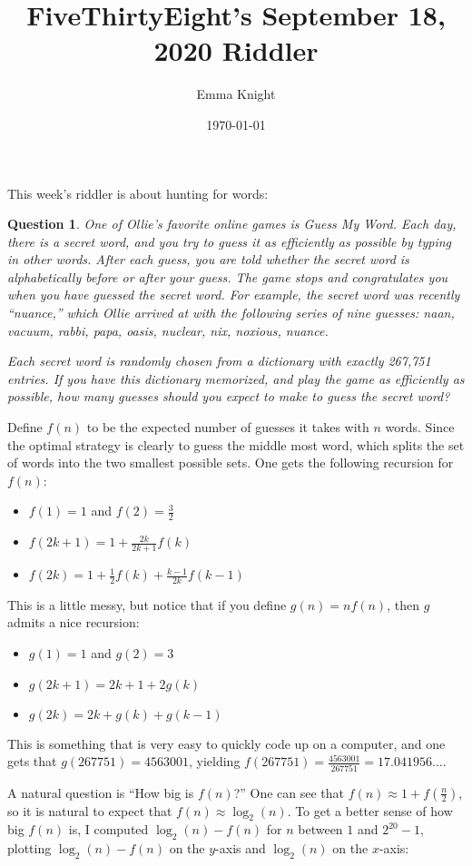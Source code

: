 \documentclass[11pt]{article}
\title{FiveThirtyEight's September 18, 2020 Riddler}
\author{Emma Knight}
\date{\today}
\newtheorem{question}[theorem]{Question}
\theoremstyle{definition}
\begin{document}
\maketitle
This week's riddler is about hunting for words:
\begin{question}
One of Ollie’s favorite online games is Guess My Word. Each day, there is a secret word, and you try to guess it as efficiently as possible by typing in other words. After each guess, you are told whether the secret word is alphabetically before or after your guess. The game stops and congratulates you when you have guessed the secret word. For example, the secret word was recently ``nuance,'' which Ollie arrived at with the following series of nine guesses: naan, vacuum, rabbi, papa, oasis, nuclear, nix, noxious, nuance.

Each secret word is randomly chosen from a dictionary with exactly 267,751 entries. If you have this dictionary memorized, and play the game as efficiently as possible, how many guesses should you expect to make to guess the secret word?
\end{question}
Define $f(n)$ to be the expected number of guesses it takes with $n$ words.  Since the optimal strategy is clearly to guess the middle most word, which splits the set of words into the two smallest possible sets.  One gets the following recursion for $f(n)$:
\begin{itemize}
\item $f(1) = 1$ and $f(2) = \frac{3}{2}$
\item $f(2k+1) = 1 + \frac{2k}{2k+1} f(k)$
\item $f(2k) = 1 + \frac{1}{2}f(k) + \frac{k-1}{2k} f(k-1)$
\end{itemize}
This is a little messy, but notice that if you define $g(n) = nf(n)$, then $g$ admits a nice recursion:
\begin{itemize}
\item $g(1) = 1$ and $g(2) = 3$
\item $g(2k+1) = 2k+1 + 2g(k)$
\item $g(2k) = 2k + g(k) + g(k-1)$
\end{itemize}
This is something that is very easy to quickly code up on a computer, and one gets that $g(267751) = 4563001$, yielding $f(267751) = \frac{4563001}{267751} = 17.041956\ldots$.

A natural question is ``How big is $f(n)$?''  One can see that $f(n) \approx 1 + f(\frac{n}{2})$, so it is natural to expect that $f(n) \approx \log_2(n)$.  To get a better sense of how big $f(n)$ is, I computed $\log_2(n)-f(n)$ for $n$ between $1$ and $2^{20}-1$, plotting $\log_2(n)-f(n)$ on the $y$-axis and $\log_2(n)$ on the $x$-axis:
\end{document}
